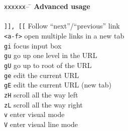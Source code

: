 \documentclass{article}
\newcommand{\widetabhead}{\texttt{xxxxxx}-- \= \kill}
\begin{document}
\begin{multicols*}{4}
    \columnbreak
    
    \begin{tabbing}
      \widetabhead
      \textbf{Advanced usage} \\
      \\
      \texttt{]], [[} \> Follow \enquote{next}/\enquote{previous} link \\
      \texttt{<a-f>}  \> open multiple links in a new tab \\
      \texttt{gi}     \> focus input box \\
      \texttt{gu}     \> go up one level in the URL \\
      \texttt{gU}     \> go up to root of the URL \\
      \texttt{ge}     \> edit the current URL \\
      \texttt{gE}     \> edit the current URL (new tab) \\
      \texttt{zH}     \> scroll all the way left \\
      \texttt{zL}     \> scroll all the way right \\
      \texttt{v}      \> enter visual mode \\
      \texttt{V}      \> enter visual line mode \\
    \end{tabbing}
  \end{multicols*}
\end{document}
